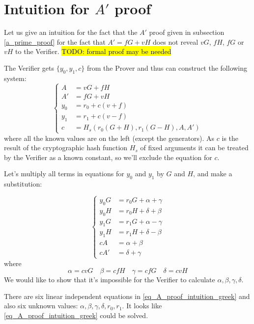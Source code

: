 \documentclass{article}
\numberwithin{figure}{section}
\begin{document}
\newpage
\section{Intuition for $A'$ proof} \label{s_A'_proof_intuition}

Let us give an intuition for the fact that the $A'$ proof given in subsection \ref{a_prime_proof} for the fact that $A' = fG + vH$  does not reveal $vG$, $fH$, $fG$ or $vH$ to the Verifier. \hl{TODO: formal proof may be needed}

The Verifier gets $\{y_0, y_1, c\}$ from the Prover and thus can construct the following system: 
\begin{equation*} %
    \left\{ \begin{aligned} 
        A &= vG + fH \\
        A' &= fG + vH \\
        y_0 &= r_0 + c (v + f) \\
        y_1 &= r_1 + c (v - f) \\
        c &= H_s(r_0(G+H), r_1(G-H), A, A')
    \end{aligned} \right.
\end{equation*}
where all the known values are on the left (except the generators). As $c$ is the result of the cryptographic hash function $H_s$ of fixed arguments it can be treated by the Verifier as a known constant, so we'll exclude the equation for $c$.

Let's multiply all terms in equations for $y_0$ and $y_1$ by $G$ and $H$, and make a substitution:

\begin{equation} \label{eq_A_proof_intuition_greek}
    \left\{ \begin{aligned} 
        y_0 G &= r_0 G + \alpha + \gamma \\
        y_0 H &= r_0 H + \delta + \beta \\
        y_1 G &= r_1 G + \alpha - \gamma \\
        y_1 H &= r_1 H + \delta - \beta \\
        cA &= \alpha + \beta \\
        cA' &= \delta + \gamma
    \end{aligned} \right.
\end{equation}
where
\[
\alpha = cvG \quad \beta = cfH \quad \gamma = cfG \quad \delta = cvH
\]
We would like to show that it's impossible for the Verifier to calculate $\alpha, \beta, \gamma, \delta$.

There are six linear independent equations in \eqref{eq_A_proof_intuition_greek} and also six unknown values: $\alpha, \beta, \gamma, \delta, r_0, r_1$. It looks like \eqref{eq_A_proof_intuition_greek} could be solved.
\end{document}
